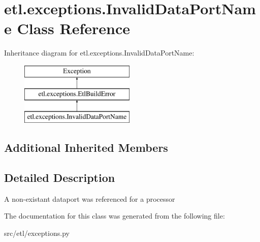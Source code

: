 \hypertarget{classetl_1_1exceptions_1_1InvalidDataPortName}{\section{etl.\-exceptions.\-Invalid\-Data\-Port\-Name Class Reference}
\label{classetl_1_1exceptions_1_1InvalidDataPortName}
}
Inheritance diagram for etl.\-exceptions.\-Invalid\-Data\-Port\-Name\-:\begin{figure}[H]
\begin{center}
\leavevmode
\includegraphics[height=3.000000cm]{classetl_1_1exceptions_1_1InvalidDataPortName}
\end{center}
\end{figure}
\subsection*{Additional Inherited Members}


\subsection{Detailed Description}
\begin{DoxyVerb}A non-existant dataport was referenced for a processor\end{DoxyVerb}
 

The documentation for this class was generated from the following file\-:\begin{DoxyCompactItemize}
\item 
src/etl/exceptions.\-py\end{DoxyCompactItemize}
